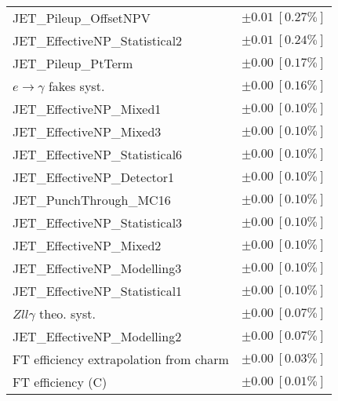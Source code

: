 \begin{tabular}{lr}
JET\_Pileup\_OffsetNPV & $\pm 0.01\ [0.27\%]$ \\
JET\_EffectiveNP\_Statistical2 & $\pm 0.01\ [0.24\%]$ \\
JET\_Pileup\_PtTerm & $\pm 0.00\ [0.17\%]$ \\
$e\to\gamma$ fakes syst. & $\pm 0.00\ [0.16\%]$ \\
JET\_EffectiveNP\_Mixed1 & $\pm 0.00\ [0.10\%]$ \\
JET\_EffectiveNP\_Mixed3 & $\pm 0.00\ [0.10\%]$ \\
JET\_EffectiveNP\_Statistical6 & $\pm 0.00\ [0.10\%]$ \\
JET\_EffectiveNP\_Detector1 & $\pm 0.00\ [0.10\%]$ \\
JET\_PunchThrough\_MC16 & $\pm 0.00\ [0.10\%]$ \\
JET\_EffectiveNP\_Statistical3 & $\pm 0.00\ [0.10\%]$ \\
JET\_EffectiveNP\_Mixed2 & $\pm 0.00\ [0.10\%]$ \\
JET\_EffectiveNP\_Modelling3 & $\pm 0.00\ [0.10\%]$ \\
JET\_EffectiveNP\_Statistical1 & $\pm 0.00\ [0.10\%]$ \\
$Zll\gamma$ theo. syst. & $\pm 0.00\ [0.07\%]$ \\
JET\_EffectiveNP\_Modelling2 & $\pm 0.00\ [0.07\%]$ \\
FT efficiency extrapolation from charm & $\pm 0.00\ [0.03\%]$ \\
FT efficiency (C) & $\pm 0.00\ [0.01\%]$ \\
\hline
\end{tabular}
